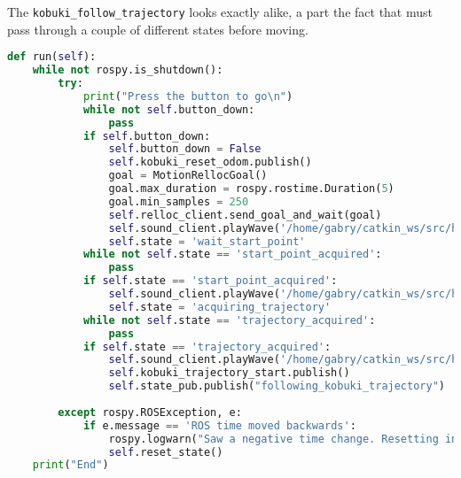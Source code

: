 The \texttt{kobuki\_follow\_trajectory} looks exactly alike, a part the fact that must pass through a couple of different states before moving.
\begin{lstlisting}[caption={Run Kobuki Follow Trajectory},label={lst:kft},language=Python]
def run(self):
    while not rospy.is_shutdown():
        try:
            print("Press the button to go\n")
            while not self.button_down:
                pass
            if self.button_down:
                self.button_down = False
                self.kobuki_reset_odom.publish()
                goal = MotionRellocGoal()
                goal.max_duration = rospy.rostime.Duration(5)
                goal.min_samples = 250
                self.relloc_client.send_goal_and_wait(goal)
                self.sound_client.playWave('/home/gabry/catkin_ws/src/hmri_pt_laser/nodes/sounds/beep.wav')
                self.state = 'wait_start_point'
            while not self.state == 'start_point_acquired':
                pass
            if self.state == 'start_point_acquired':
                self.sound_client.playWave('/home/gabry/catkin_ws/src/hmri_pt_laser/nodes/sounds/beep.wav')
                self.state = 'acquiring_trajectory'
            while not self.state == 'trajectory_acquired':
                pass
            if self.state == 'trajectory_acquired':
                self.sound_client.playWave('/home/gabry/catkin_ws/src/hmri_pt_laser/nodes/sounds/beep.wav')
                self.kobuki_trajectory_start.publish()
                self.state_pub.publish("following_kobuki_trajectory")
                
        except rospy.ROSException, e:
            if e.message == 'ROS time moved backwards':
                rospy.logwarn("Saw a negative time change. Resetting internal state...")
                self.reset_state()
    print("End")
\end{lstlisting}

